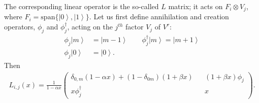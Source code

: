 \documentclass[ALCO, Unicode]{cedram}
\newcommand{\ket}[1]{\left|#1\right\rangle}
\def\phid{\phi^\dagger}
\begin{document}
The corresponding linear operator is the so-called $L$ matrix; it acts on $F_i \otimes V_j$, where $F_i= \text{span}\{ \ket{0},\ket{1}\}$. Let us first define annihilation and creation operators, $\phi_j$ and  $\phid_j$, acting on the $j^{th}$ factor $V_j$ of $V^{r}$:
\begin{align*}
\phi_j \ket{m}
&=
\ket{m-1}
\qquad
\phid_j \ket{m}
= \ket{m+1}\\
\phi_j \ket{0}
&=
\ket{0}.
\end{align*}
Then
\begin{align}
\label{canLmat}
{{L}}_{i,j}(x)
=
{\frac{1}{1-\alpha x}}
\begin{pmatrix}
\delta_{0,m}(1-\alpha x)+(1-\delta_{0m})(1+\beta x)  &{} & (1+\beta x)\phi_j \\
x \phid_j &{} & x
\end{pmatrix}.
\end{align}
\end{document}

